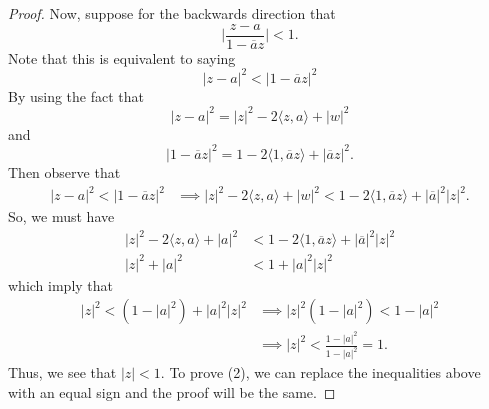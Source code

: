 \documentclass[a4paper]{article}
\begin{document}
\begin{enumerate}
\begin{proof}
                Now, suppose for the backwards direction that 
                \[  \Big| \frac{  z - a  }{  1 - \overline{a}z }  \Big|  < 1. \]
                Note that this is equivalent to saying
                \[  | z - a  |^{2}  < | 1 - \overline{a }z  |^{2}  \]
                By using the fact that 
                \[  | z - a  |^{2} = | z  |^{2} - 2 \langle z  , a \rangle + | w  |^{2} \]
                and 
                \[  | 1 - \overline{a}z |^{2} = 1 - 2 \langle 1  , \overline{a} z  \rangle + | \overline{a}z  |^{2}.  \]
                Then observe that 
                \begin{align*}
                    | z - a  |^{2} < | 1 - \overline{a}z |^{2} &\implies   
                    | z  |^{2} - 2 \langle z , a \rangle + | w  |^{2} < 1 - 2 \langle 1  , \overline{a}z \rangle + | \overline{a} |^{2} | z  |^{2}.
                \end{align*}
                So, we must have 
                \begin{align*}
                    | z  |^{2} - 2 \langle z , a \rangle + | a |^{2} &< 1 - 2 \langle 1  , \overline{a}z \rangle + | \overline{a} |^{2} | z |^{2} \\
                    | z |^{2} + | a |^{2} &< 1 + | a |^{2} | z |^{2} 
                \end{align*}
                which imply that 
                \begin{align*}
                    | z |^{2} < ( 1 - | a |^{2}) + | a |^{2} | z |^{2} &\implies | z  |^{2} ( 1 - | a |^{2} ) < 1 - | a |^{2}   \\
                                                                       &\implies | z  |^{2}  < \frac{ 1 - | a |^{2}  }{  1 - | a |^{2}  }  = 1.
                \end{align*}
                Thus, we see that \( | z  | < 1  \). To prove (2), we can replace the inequalities above with an equal sign and the proof will be the same.
            \end{proof}
        \end{enumerate}
\end{document}
